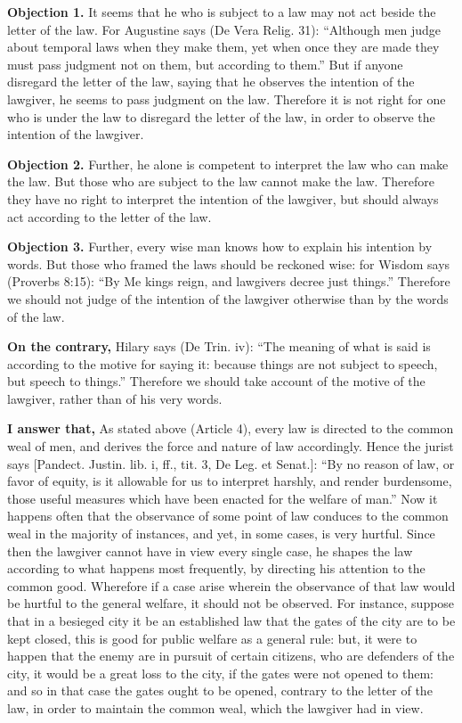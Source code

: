 
\textbf{Objection 1.} It seems that he who is subject to a law may not act beside the letter of the law. For Augustine says (De Vera Relig. 31): ``Although men judge about temporal laws when they make them, yet when once they are made they must pass judgment not on them, but according to them.'' But if anyone disregard the letter of the law, saying that he observes the intention of the lawgiver, he seems to pass judgment on the law. Therefore it is not right for one who is under the law to disregard the letter of the law, in order to observe the intention of the lawgiver.

\textbf{Objection 2.} Further, he alone is competent to interpret the law who can make the law. But those who are subject to the law cannot make the law. Therefore they have no right to interpret the intention of the lawgiver, but should always act according to the letter of the law.

\textbf{Objection 3.} Further, every wise man knows how to explain his intention by words. But those who framed the laws should be reckoned wise: for Wisdom says (Proverbs 8:15): ``By Me kings reign, and lawgivers decree just things.'' Therefore we should not judge of the intention of the lawgiver otherwise than by the words of the law.

\textbf{On the contrary,} Hilary says (De Trin. iv): ``The meaning of what is said is according to the motive for saying it: because things are not subject to speech, but speech to things.'' Therefore we should take account of the motive of the lawgiver, rather than of his very words.

\textbf{I answer that,} As stated above (Article 4), every law is directed to the common weal of men, and derives the force and nature of law accordingly. Hence the jurist says [Pandect. Justin. lib. i, ff., tit. 3, De Leg. et Senat.]: ``By no reason of law, or favor of equity, is it allowable for us to interpret harshly, and render burdensome, those useful measures which have been enacted for the welfare of man.'' Now it happens often that the observance of some point of law conduces to the common weal in the majority of instances, and yet, in some cases, is very hurtful. Since then the lawgiver cannot have in view every single case, he shapes the law according to what happens most frequently, by directing his attention to the common good. Wherefore if a case arise wherein the observance of that law would be hurtful to the general welfare, it should not be observed. For instance, suppose that in a besieged city it be an established law that the gates of the city are to be kept closed, this is good for public welfare as a general rule: but, it were to happen that the enemy are in pursuit of certain citizens, who are defenders of the city, it would be a great loss to the city, if the gates were not opened to them: and so in that case the gates ought to be opened, contrary to the letter of the law, in order to maintain the common weal, which the lawgiver had in view.

